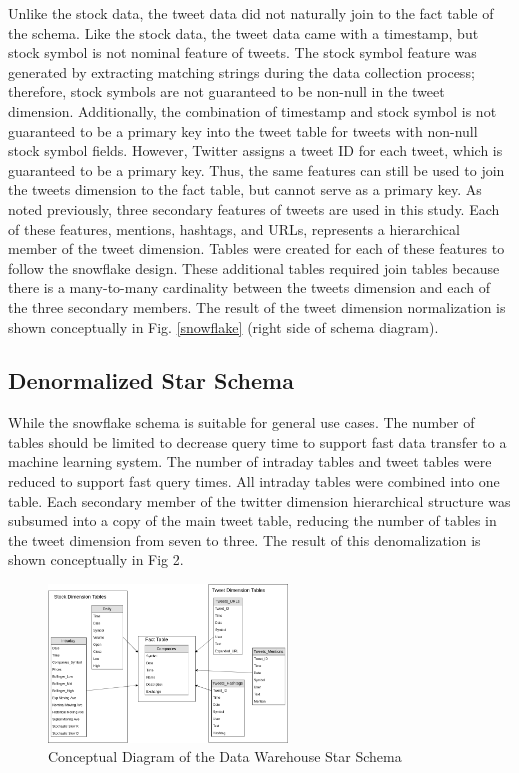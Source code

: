 \documentclass[journal]{IEEEtran}
\begin{document}
Unlike the stock data, the tweet data did not naturally join to the fact
 table of the schema.
Like the stock data, the tweet data came with a timestamp, but stock symbol
 is not nominal feature of tweets.
The stock symbol feature was generated by extracting matching strings
 during the data collection process; therefore, stock symbols are not
 guaranteed to be non-null in the tweet dimension.
Additionally, the combination of timestamp and stock symbol is not guaranteed
 to be a primary key into the tweet table for tweets with non-null stock symbol
 fields.
However, Twitter assigns a tweet ID for each tweet, which is guaranteed to be
 a primary key.
Thus, the same features can still be used to join the tweets dimension to the 
 fact table, but cannot serve as a primary key.
As noted previously, three secondary features of tweets are used in this study.
Each of these features, mentions, hashtags, and URLs, represents a hierarchical
 member of the tweet dimension.
Tables were created for each of these features to follow the snowflake design.
These additional tables required join tables because there is a many-to-many
 cardinality between the tweets dimension and each of the three secondary members.
The result of the tweet dimension normalization is shown conceptually
 in Fig. \ref{snowflake} (right side of schema diagram).

\subsection{Denormalized Star Schema}

While the snowflake schema is suitable for general use cases.
The number of tables should be limited to decrease query time to support
 fast data transfer to a machine learning system.
The number of intraday tables and tweet tables were reduced to support
 fast query times.
All intraday tables were combined into one table. 
Each secondary member of the twitter dimension hierarchical structure was
 subsumed into a copy of the main tweet table, reducing the number of tables
 in the tweet dimension from seven to three.
The result of this denomalization is shown conceptually in Fig 2.


\begin{figure}
	\centering
	\includegraphics[width=2.5in]{Star_Conceptual_Schema.png}
	\caption{Conceptual Diagram of the Data Warehouse Star Schema}
	\label{star}
\end{figure}
\end{document}
